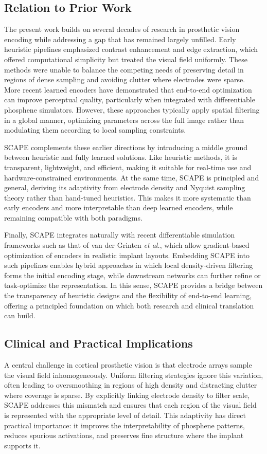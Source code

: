 \subsection{Relation to Prior Work}
The present work builds on several decades of research in prosthetic vision encoding while addressing a gap that has remained largely unfilled. Early heuristic pipelines emphasized contrast enhancement and edge extraction, which offered computational simplicity but treated the visual field uniformly. These methods were unable to balance the competing needs of preserving detail in regions of dense sampling and avoiding clutter where electrodes were sparse. More recent learned encoders have demonstrated that end-to-end optimization can improve perceptual quality, particularly when integrated with differentiable phosphene simulators. However, these approaches typically apply spatial filtering in a global manner, optimizing parameters across the full image rather than modulating them according to local sampling constraints.

SCAPE complements these earlier directions by introducing a middle ground between heuristic and fully learned solutions. Like heuristic methods, it is transparent, lightweight, and efficient, making it suitable for real-time use and hardware-constrained environments. At the same time, SCAPE is principled and general, deriving its adaptivity from electrode density and Nyquist sampling theory rather than hand-tuned heuristics. This makes it more systematic than early encoders and more interpretable than deep learned encoders, while remaining compatible with both paradigms.

Finally, SCAPE integrates naturally with recent differentiable simulation frameworks such as that of van der Grinten \emph{et al.}, which allow gradient-based optimization of encoders in realistic implant layouts. Embedding SCAPE into such pipelines enables hybrid approaches in which local density-driven filtering forms the initial encoding stage, while downstream networks can further refine or task-optimize the representation. In this sense, SCAPE provides a bridge between the transparency of heuristic designs and the flexibility of end-to-end learning, offering a principled foundation on which both research and clinical translation can build.

\subsection{Clinical and Practical Implications}
A central challenge in cortical prosthetic vision is that electrode arrays sample the visual field inhomogeneously. Uniform filtering strategies ignore this variation, often leading to oversmoothing in regions of high density and distracting clutter where coverage is sparse. By explicitly linking electrode density to filter scale, SCAPE addresses this mismatch and ensures that each region of the visual field is represented with the appropriate level of detail. This adaptivity has direct practical importance: it improves the interpretability of phosphene patterns, reduces spurious activations, and preserves fine structure where the implant supports it.

